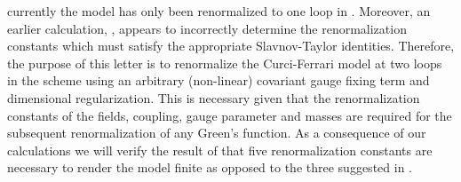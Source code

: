 \documentclass[a4paper,11pt]{article}
\providecommand{\MSbar}{\overline{\mbox{MS}}}
\begin{document}
currently the model has only been renormalized to one loop in \cite{4}. 
Moreover, an earlier calculation, \cite{14}, appears to incorrectly determine 
the renormalization constants which must satisfy the appropriate Slavnov-Taylor
identities. Therefore, the purpose of this letter is to renormalize the 
Curci-Ferrari model at two loops in the \myHighlight{$\MSbar$}\coordHE{} scheme using an arbitrary 
(non-linear) covariant gauge fixing term and dimensional regularization. This 
is necessary given that the renormalization constants of the fields, coupling, 
gauge parameter and masses are required for the subsequent renormalization of 
any Green's function. As a consequence of our calculations we will verify the 
result of \cite{4} that five renormalization constants are necessary to render 
the model finite as opposed to the three suggested in \cite{3}. 
\end{document}
